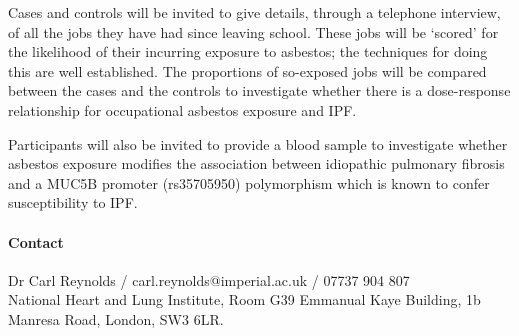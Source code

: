 \documentclass[a4paper,10pt]{article}
\begin{document}
Cases and controls will be invited to give details, through a telephone interview, of all the jobs they have had since leaving school. These jobs will be ‘scored’ for the likelihood of their incurring exposure to asbestos; the techniques for doing this are well established. The proportions of so-exposed jobs will be compared between the cases and the controls to investigate whether there is a dose-response relationship for occupational asbestos exposure and IPF. 

Participants will also be invited to provide a blood sample to investigate whether asbestos exposure modifies the association between idiopathic pulmonary fibrosis and a MUC5B promoter (rs35705950) polymorphism which is known to confer susceptibility to IPF.

\paragraph{Contact} Dr Carl Reynolds / carl.reynolds@imperial.ac.uk / 07737 904 807 
\\ National Heart and Lung Institute, Room G39 Emmanual Kaye Building, 1b Manresa Road, London, SW3 6LR.
 
\end{document}
